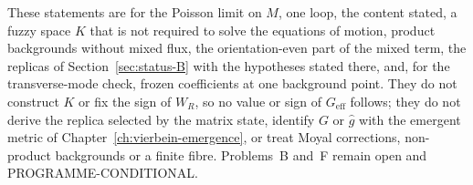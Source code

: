 These statements are for the Poisson limit on \(M\), one loop, the content stated, a fuzzy space \(K\) that is not required to solve the equations of motion, product backgrounds without mixed flux, the orientation-even part of the mixed term, the replicas of Section~\ref{sec:status-B} with the hypotheses stated there, and, for the transverse-mode check, frozen coefficients at one background point. They do not construct \(K\) or fix the sign of \(W_R\), so no value or sign of \(G_{\mathrm{eff}}\) follows; they do not derive the replica selected by the matrix state, identify \(G\) or \(\hat g\) with the emergent metric of Chapter~\ref{ch:vierbein-emergence}, or treat Moyal corrections, non-product backgrounds or a finite fibre. Problems~B and~F remain open and PROGRAMME-CONDITIONAL.
